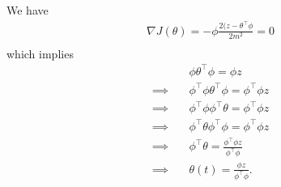 \documentclass[]{article}
\begin{document}
\section{}
We have
\begin{equation}\begin{aligned}
\nabla J(\theta) = -\phi \frac{2(z-\theta^\top \phi}{2m^2} = 0 \\
\end{aligned}\end{equation}
which implies
\begin{equation}\begin{aligned}
&\phi \theta^\top \phi = \phi z \\
\implies\quad &\phi^\top \phi \theta^\top \phi = \phi^\top \phi z \\
\implies\quad & \phi^\top \phi \phi^\top \theta = \phi^\top \phi z \\
\implies\quad & \phi^\top \theta \phi^\top \phi = \phi^\top \phi z \\
\implies\quad & \phi^\top \theta = \frac{\phi^\top \phi z }{\phi^\top \phi} \\
\implies\quad & \theta(t) = \frac{\phi z}{\phi^\top \phi}.
\end{aligned}\end{equation}
\end{document}
